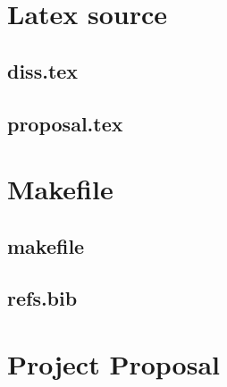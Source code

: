 \documentclass[12pt,a4paper,twoside,openright]{report}
\begin{document}


\appendix

\chapter{Latex source}

\section{diss.tex}
{\scriptsize}

\section{proposal.tex}
{\scriptsize}

\chapter{Makefile}

\section{makefile}\label{makefile}
{\scriptsize}

\section{refs.bib}
{\scriptsize}


\chapter{Project Proposal}


\end{document}
